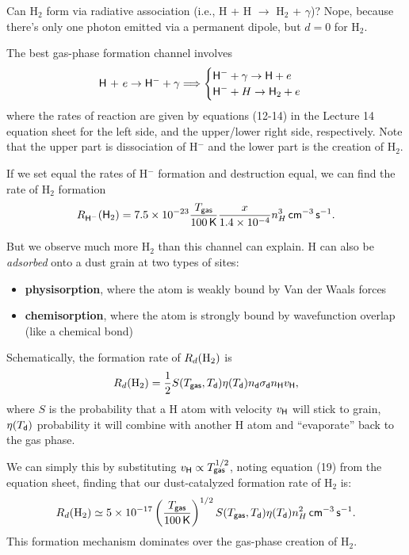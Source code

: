 \documentclass{tufte-handout}
\renewcommand{\textbf}[1]{{\bf \textcolor{dark-gray}{#1}}}
\renewcommand{\rm}{\sf}
\renewcommand{\textrm}{\textsf}
\newcommand{\Htwo}{\textnormal{H$_2$}}
\newcommand{\e}[1]{\times 10^{#1}}
\begin{document}
Can H$_2$ form via radiative association (i.e., H + H $\rightarrow$ H$_2$ + $\gamma$)? Nope, because there's only one photon emitted via a permanent dipole, but $d=0$ for H$_2$.

The best gas-phase formation channel involves
\begin{equation*}
\textrm{H + }e \rightarrow {\rm H^{-}}+ \gamma \Longrightarrow 
\begin{cases}
\textrm{H}^{-} + \gamma \rightarrow \textrm{H} + e\\
\textrm{H}^{-} + H \rightarrow \textrm{H}_2 + e
\end{cases}
\end{equation*}
where the rates of reaction are given by equations (12-14) in the Lecture 14 equation sheet for the left side, and the upper/lower right side, respectively. Note that the upper part is dissociation of H$^-$ and the lower part is the creation of H$_2$.

If we set equal the rates of H$^-$ formation and destruction equal, we can find the rate of H$_2$ formation
\[ R_{\textrm{H}^-}(\textrm{H}_2) = 7.5\e{-23} \frac{T_{\rm gas}}{100\, \textrm{K}} \frac{x}{1.4\e{-4}} n_H^3\, \textrm{cm}^{-3}\, \textrm{s}^{-1}.\]


But we observe much more \Htwo{} than this channel can explain. H can also be \textit{adsorbed} onto a dust grain at two types of sites:
\begin{itemize}
\item[] \textbf{physisorption}, where the atom is weakly bound by Van der Waals forces
\item[] \textbf{chemisorption}, where the atom is strongly bound by wavefunction overlap (like a chemical bond)
\end{itemize}

Schematically, the formation rate of $R_d(\textrm{\Htwo})$ is
\begin{equation}
R_d(\textrm{\Htwo}) = \frac{1}{2} S(T_{\rm gas}, T_{\rm d}) \eta(T_{\rm d}) n_{\rm d} \sigma_{\rm d} n_{\rm H} v_{\rm H},
\end{equation}
where $S$ is the probability that a H atom with velocity $v_{\rm H}$ will stick to grain, $\eta(T_{\rm d})$ probability it will combine with another H atom and ``evaporate'' back to the gas phase.

We can simply this by substituting $v_{\rm H} \propto T_{\rm gas}^{1/2}$, noting equation (19) from the equation sheet, finding that our dust-catalyzed formation rate of \Htwo{} is:
\[R_d(\textrm{\Htwo}) \simeq 5\e{-17} \left (\frac{T_{\rm gas}}{100\, \textrm{K}}\right )^{1/2}S(T_{\rm gas}, T_{\rm d}) \eta(T_{\rm d}) n_H^2\, \textrm{cm}^{-3}\, \textrm{s}^{-1}. \]
This formation mechanism dominates over the gas-phase creation of \Htwo{}.
\end{document}
